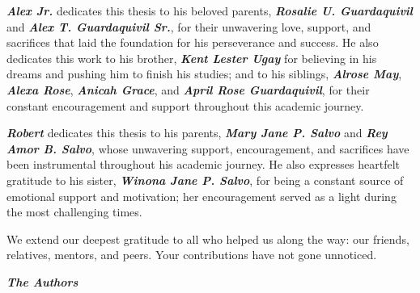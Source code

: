 {	\textbf{\textit{Alex Jr.}} dedicates this thesis to his beloved parents, \textbf{\textit{Rosalie U. Guardaquivil}} and \textbf{\textit{Alex T. Guardaquivil Sr.}}, for their unwavering love, support, and sacrifices that laid the foundation for his perseverance and success. He also dedicates this work to his brother, \textbf{\textit{Kent Lester Ugay}} for believing in his dreams and pushing him to finish his studies; and to his siblings, \textbf{\textit{Alrose May}}, \textbf{\textit{Alexa Rose}}, \textbf{\textit{Anicah Grace}}, and \textbf{\textit{April Rose Guardaquivil}}, for their constant encouragement and support throughout this academic journey.
	
	\textbf{\textit{Robert}} dedicates this thesis to his parents, \textbf{\textit{Mary Jane P. Salvo}} and \textbf{\textit{Rey Amor B. Salvo}}, whose unwavering support, encouragement, and sacrifices have been instrumental throughout his academic journey. He also expresses heartfelt gratitude to his sister, \textbf{\textit{Winona Jane P. Salvo}}, for being a constant source of emotional support and motivation; her encouragement served as a light during the most challenging times.
	
	We extend our deepest gratitude to all who helped us along the way: our friends, relatives, mentors, and peers. Your contributions have not gone unnoticed.
	
	\vspace{24pt}
	
	\begin{flushright}
		\textbf{\textit{The Authors}}
	\end{flushright}
	
}